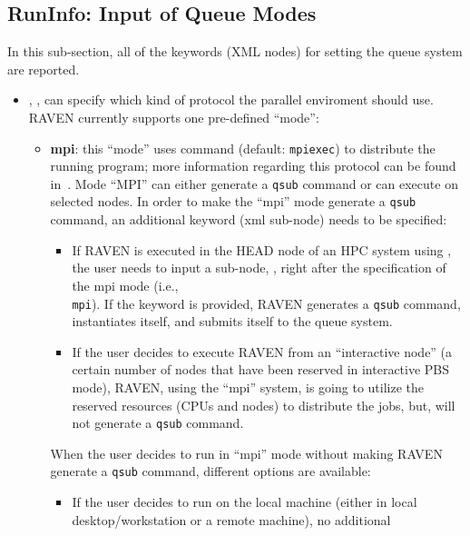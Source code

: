 \subsection{RunInfo: Input of Queue Modes}
\label{subsec:runinfoModes}
In this sub-section, all of the keywords (XML nodes) for setting the queue
system are reported.
\begin{itemize}
\item {}, , can specify which kind
of protocol the parallel enviroment should use.
%
RAVEN currently supports one pre-defined ``mode'':
  \begin{itemize}
    \item \textbf{mpi}: this ``mode'' uses   command (default: \texttt{mpiexec})
      to distribute the running program; more information regarding this protocol can be found
      in~\cite{MPI}.
      Mode ``MPI''  can either generate a \texttt{qsub} command or can execute
      on selected nodes.
      In order to make the ``mpi'' mode generate a \texttt{qsub} command, an
      additional keyword (xml sub-node) needs to be specified:
         \begin{itemize}
         \item If RAVEN is executed in the HEAD node of an HPC system using
           \cite{PBS}, the user needs to input a sub-node, ,
           right after the specification of the mpi mode (i.e.,\\
             \texttt{mpi}).
             If the keyword is provided, RAVEN generates a \texttt{qsub}
             command, instantiates itself, and submits itself to the queue
             system.
           \item If the user decides to execute RAVEN from an ``interactive
             node'' (a certain number of nodes that have been reserved in
             interactive PBS mode), RAVEN, using the ``mpi'' system, is going to
             utilize the reserved resources (CPUs and nodes) to distribute the
             jobs, but, will not generate a \texttt{qsub} command.
         \end{itemize}
     When the user decides to run in ``mpi'' mode without making RAVEN generate
     a \texttt{qsub} command, different options are available:
      \begin{itemize}
           \item If the user decides to run on the local machine (either in
             local desktop/workstation or a remote machine), no additional

\end{itemize}
\end{itemize}
\end{itemize}
